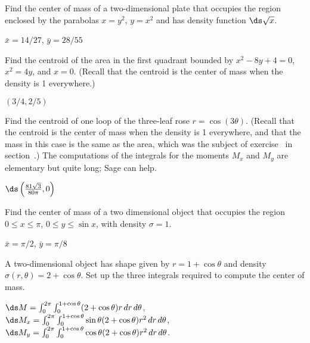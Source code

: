 \begin{exercises}
\begin{exercise} Find the center of mass of a two-dimensional plate 
that occupies the region enclosed by the parabolas $x=y^2$, $y=x^2$
and has density
function $\ds\sqrt{x}$.
\begin{answer} $\bar x=14/27$, $\bar y=28/55$
\end{answer}\end{exercise}

\begin{exercise} Find the centroid of the area in the first quadrant bounded by
 $x^2-8y+4=0$, $x^2=4y$, and $x=0$. (Recall that the centroid
is the center of mass when the density is 1 everywhere.)
\begin{answer} $(3/4,2/5)$
\end{answer}\end{exercise}

\begin{exercise} Find the centroid of one loop of the three-leaf rose
$r=\cos(3\theta)$.  (Recall that the centroid is the
center of mass when the density is 1 everywhere, and that the mass in
this case is the same as the area, which was the subject of
exercise~ in
section~.)  The
computations of the integrals for the moments $M_x$ and $M_y$ are
elementary but quite long; Sage can help.
\begin{answer} $\ds\left({81\sqrt3\over80\pi},0\right)$
\end{answer}\end{exercise}


\begin{exercise} Find the center of mass of a two dimensional
object that occupies the region $0\le x\le \pi$, $0\le y\le \sin x$,
with density $\sigma=1$.
\begin{answer} $\bar x=\pi/2$, $\bar y=\pi/8$ 
\end{answer}\end{exercise}

\begin{exercise} A two-dimensional object has shape given by 
$r=1+\cos\theta$ and density $\sigma(r,\theta)=2+\cos\theta$. Set up
the three integrals required to compute the center of mass.
\begin{answer} $\ds M=\int_0^{2\pi} \int_0^{1+\cos\theta} (2+\cos\theta)r\,dr\,d\theta$,
\hfill\break
$\ds M_x=\int_0^{2\pi} \int_0^{1+\cos\theta} \sin\theta(2+\cos\theta)r^2\,dr\,d\theta$,
\hfill\break
$\ds M_y=\int_0^{2\pi} \int_0^{1+\cos\theta} \cos\theta(2+\cos\theta)r^2\,dr\,d\theta$.
\end{answer}\end{exercise}


\end{exercises}
